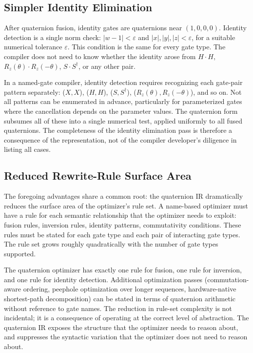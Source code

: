 \documentclass[conference]{IEEEtran}
\begin{document}
\subsection{Simpler Identity Elimination}

After quaternion fusion, identity gates are quaternions near $(1, 0, 0, 0)$. Identity
detection is a single norm check: $|w - 1| < \varepsilon$ and $|x|, |y|, |z| < \varepsilon$,
for a suitable numerical tolerance $\varepsilon$. This condition is the same for every gate
type. The compiler does not need to know whether the identity arose from $H \cdot H$,
$R_z(\theta) \cdot R_z(-\theta)$, $S \cdot S^\dagger$, or any other pair.

In a named-gate compiler, identity detection requires recognizing each gate-pair pattern
separately: ($X, X$), ($H, H$), ($S, S^\dag$), ($R_z(\theta), R_z(-\theta)$), and so on.
Not all patterns can be enumerated in advance, particularly for parameterized gates where
the cancellation depends on the parameter values. The quaternion form subsumes all of these
into a single numerical test, applied uniformly to all fused quaternions. The completeness
of the identity elimination pass is therefore a consequence of the representation, not of
the compiler developer's diligence in listing all cases.

\subsection{Reduced Rewrite-Rule Surface Area}

The foregoing advantages share a common root: the quaternion IR dramatically reduces the
surface area of the optimizer's rule set. A name-based optimizer must have a rule for each
semantic relationship that the optimizer needs to exploit: fusion rules, inversion rules,
identity patterns, commutativity conditions. These rules must be stated for each gate type
and each pair of interacting gate types. The rule set grows roughly quadratically with
the number of gate types supported.

The quaternion optimizer has exactly one rule for fusion, one rule for inversion, and one
rule for identity detection. Additional optimization passes (commutation-aware ordering,
peephole optimization over longer sequences, hardware-native shortest-path decomposition)
can be stated in terms of quaternion arithmetic without reference to gate names. The
reduction in rule-set complexity is not incidental; it is a consequence of operating at
the correct level of abstraction. The quaternion IR exposes the structure that the
optimizer needs to reason about, and suppresses the syntactic variation that the optimizer
does not need to reason about.
\end{document}
